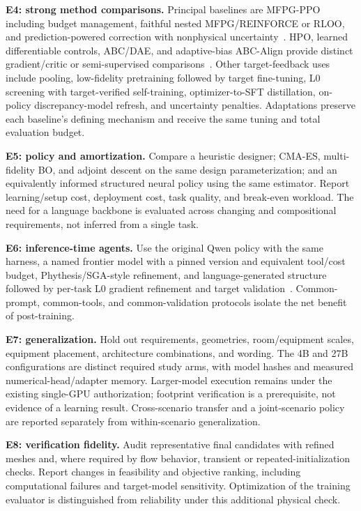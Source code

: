 \textbf{E4: strong method comparisons.} Principal baselines are MFPG-PPO including budget management, faithful nested MFPG/REINFORCE or RLOO, and prediction-powered correction with nonphysical uncertainty~\cite{liu2025mfpg,liu2026mfpgppo,angelopoulos2024ppipp}. HPO, learned differentiable controls, ABC/DAE, and adaptive-bias ABC-Align provide distinct gradient/critic or semi-supervised comparisons~\cite{alvo2026hpo,grathwohl2018relax,pan2026abc,frankel2026abcalign}. Other target-feedback uses include pooling, low-fidelity pretraining followed by target fine-tuning, L0 screening with target-verified self-training, optimizer-to-SFT distillation, on-policy discrepancy-model refresh, and uncertainty penalties. Adaptations preserve each baseline's defining mechanism and receive the same tuning and total evaluation budget.

\textbf{E5: policy and amortization.} Compare a heuristic designer; CMA-ES, multi-fidelity BO, and adjoint descent on the same design parameterization; and an equivalently informed structured neural policy using the same estimator. Report learning/setup cost, deployment cost, task quality, and break-even workload. The need for a language backbone is evaluated across changing and compositional requirements, not inferred from a single task.

\textbf{E6: inference-time agents.} Use the original Qwen policy with the same harness, a named frontier model with a pinned version and equivalent tool/cost budget, Phythesis/SGA-style refinement, and language-generated structure followed by per-task L0 gradient refinement and target validation~\cite{li2025phythesis,ma2024sga}. Common-prompt, common-tools, and common-validation protocols isolate the net benefit of post-training.

\textbf{E7: generalization.} Hold out requirements, geometries, room/equipment scales, equipment placement, architecture combinations, and wording. The 4B and 27B configurations are distinct required study arms, with model hashes and measured numerical-head/adapter memory. Larger-model execution remains under the existing single-GPU authorization; footprint verification is a prerequisite, not evidence of a learning result. Cross-scenario transfer and a joint-scenario policy are reported separately from within-scenario generalization.

\textbf{E8: verification fidelity.} Audit representative final candidates with refined meshes and, where required by flow behavior, transient or repeated-initialization checks. Report changes in feasibility and objective ranking, including computational failures and target-model sensitivity. Optimization of the training evaluator is distinguished from reliability under this additional physical check.


